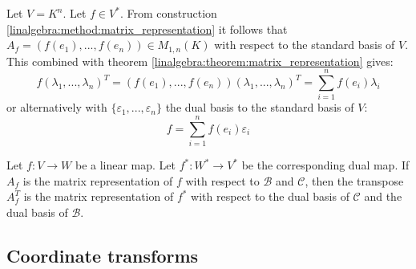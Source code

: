         \begin{theorem}
		Let $V = K^n$. Let $f\in V^*$. From construction \ref{linalgebra:method:matrix_representation} it follows that $A_f = (f(e_1), ..., f(e_n))\in M_{1,n}(K)$ with respect to the standard basis of $V$. This combined with theorem \ref{linalgebra:theorem:matrix_representation} gives:
	        \begin{equation}
			f(\lambda_1, ..., \lambda_n)^T = (f(e_1), ..., f(e_n))(\lambda_1, ..., \lambda_n)^T = \sum_{i=1}^nf(e_i)\lambda_i
		\end{equation}
        	or alternatively with $\{\varepsilon_1, ..., \varepsilon_n\}$ the dual basis to the standard basis of $V$:
	        \begin{equation}
        	    	\label{linalgebra:map_in_function_of_dual_basis}
			\boxed{f = \sum_{i=1}^nf(e_i)\varepsilon_i}
		\end{equation}
	\end{theorem}
        
        \begin{theorem}
		Let $f:V\rightarrow W$ be a linear map. Let $f^*:W^*\rightarrow V^*$ be the corresponding dual map. If $A_f$ is the matrix representation of $f$ with respect to $\mathcal{B}$ and $\mathcal{C}$, then the transpose $A_f^T$ is the matrix representation of $f^*$ with respect to the dual basis of $\mathcal{C}$ and the dual basis of $\mathcal{B}$.
	\end{theorem}
        
\subsection{Coordinate transforms}
        
        
